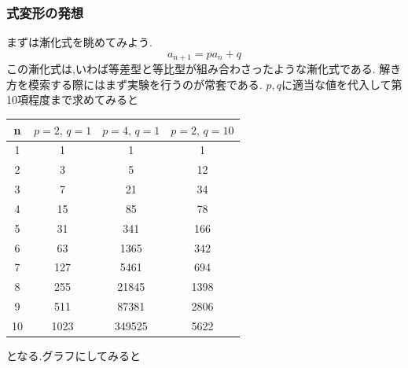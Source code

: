   \subsubsection{式変形の発想}
  まずは漸化式を眺めてみよう.
  \[
   a_{n+1}=pa_n+q
  \]
  この漸化式は,いわば等差型と等比型が組み合わさったような漸化式である.
  解き方を模索する際にはまず実験を行うのが常套である.
  $p,q$に適当な値を代入して第10項程度まで求めてみると
  \begin{center}
    \BookMathLayout{}{\footnotesize\setlength{\tabcolsep}{3pt}}%
    \begin{tabular}{cccc}\Xhline{1.5pt}
      n&	$p=2,\,q=1$&	$p=4,\,q=1$&	$p=2,\,q=10$\\\hline
      1&	1&	1&	1\\
      2&	3&	5&	12\\
      3&	7&	21&	34\\
      4&	15&	85&	78\\
      5&	31&	341&	166\\
      6&	63&	1365&	342\\
      7&	127&	5461&	694\\
      8&	255&	21845&	1398\\
      9&	511&	87381&	2806\\
      10&	1023&	349525&	5622\\
    \end{tabular}
  \end{center}
  となる.グラフにしてみると
  \par\smallskip\noindent
